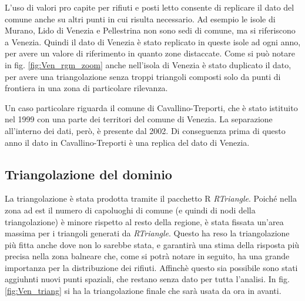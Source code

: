 \documentclass[a4paper,11pt,twoside,openright]{book}							%
\begin{document}
L'uso di valori pro capite per rifiuti e posti letto consente di replicare il dato del comune anche su altri punti in cui risulta necessario. Ad esempio le isole di Murano, Lido di Venezia e Pellestrina non sono sedi di comune, ma si riferiscono a Venezia. Quindi il dato di Venezia è stato replicato in queste isole ad ogni anno, per avere un valore di riferimento in quanto zone distaccate. Come si può notare in fig. \ref{fig:Ven_rgm_zoom} anche nell'isola di Venezia è stato duplicato il dato, per avere una triangolazione  senza troppi triangoli composti solo da punti di frontiera in una zona di particolare rilevanza.

Un caso particolare riguarda il comune di Cavallino-Treporti, che è stato istituito nel 1999 con una parte dei territori del comune di Venezia. La separazione all'interno dei dati, però, è presente dal 2002. Di conseguenza prima di questo anno il dato in Cavallino-Treporti è una replica del dato di Venezia.

\subsection{Triangolazione del dominio}

La triangolazione è stata prodotta tramite il pacchetto R \textit{RTriangle}. Poiché nella zona ad est il numero di capoluoghi di comune (e quindi di nodi della triangolazione) è minore rispetto al resto della regione, è stata fissata un'area massima per i triangoli generati da \textit{RTriangle}. Questo ha reso la triangolazione più fitta anche dove non lo sarebbe stata, e garantirà una stima della risposta più precisa nella zona balneare che, come si potrà notare in seguito, ha una grande importanza per la distribuzione dei rifiuti. Affinchè questo sia possibile sono stati aggiuhnti nuovi punti spaziali, che restano senza dato per tutta l'analisi. In fig. \ref{fig:Ven_triang} si ha la triangolazione finale che sarà usata da ora in avanti.
\end{document}
